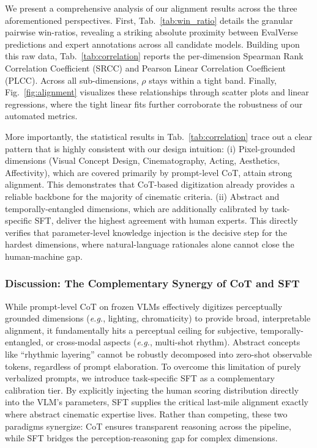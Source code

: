 \documentclass{llmxive}
\begin{document}
We present a comprehensive analysis of our alignment results across the three aforementioned perspectives. First, Tab.~\ref{tab:win_ratio} details the granular pairwise win-ratios, revealing a striking absolute proximity between EvalVerse predictions and expert annotations across all candidate models. Building upon this raw data, Tab.~\ref{tab:correlation} reports the per-dimension Spearman Rank Correlation Coefficient (SRCC) and Pearson Linear Correlation Coefficient (PLCC). Across all sub-dimensions, $\rho$ stays within a tight band. Finally, Fig.~\ref{fig:alignment} visualizes these relationships through scatter plots and linear regressions, where the tight linear fits further corroborate the robustness of our automated metrics. 

More importantly, the statistical results in Tab.~\ref{tab:correlation} trace out a clear pattern that is highly consistent with our design intuition: (i) Pixel-grounded dimensions (Visual Concept Design, Cinematography, Acting, Aesthetics, Affectivity), which are covered primarily by prompt-level CoT, attain strong alignment. This demonstrates that CoT-based digitization already provides a reliable backbone for the majority of cinematic criteria. (ii) Abstract and temporally-entangled dimensions, which are additionally calibrated by task-specific SFT, deliver the highest agreement with human experts. This directly verifies that parameter-level knowledge injection is the decisive step for the hardest dimensions, where natural-language rationales alone cannot close the human-machine gap.

\subsubsection{Discussion: The Complementary Synergy of CoT and SFT}

While prompt-level CoT on frozen VLMs effectively digitizes perceptually grounded dimensions (\emph{e.g.}, lighting, chromaticity) to provide broad, interpretable alignment, it fundamentally hits a perceptual ceiling for subjective, temporally-entangled, or cross-modal aspects (\emph{e.g.}, multi-shot rhythm). Abstract concepts like ``rhythmic layering'' cannot be robustly decomposed into zero-shot observable tokens, regardless of prompt elaboration. To overcome this limitation of purely verbalized prompts, we introduce task-specific SFT as a complementary calibration tier. By explicitly injecting the human scoring distribution directly into the VLM's parameters, SFT supplies the critical last-mile alignment exactly where abstract cinematic expertise lives. Rather than competing, these two paradigms synergize: CoT ensures transparent reasoning across the pipeline, while SFT bridges the perception-reasoning gap for complex dimensions. 
\end{document}
